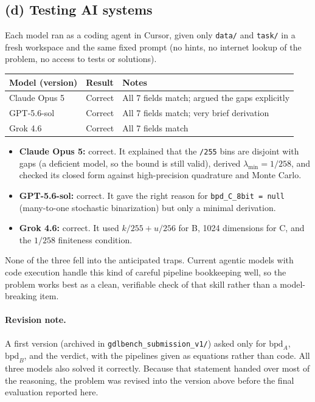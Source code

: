 \documentclass[11pt]{article}
\begin{document}
\subsection{(d) Testing AI systems}

Each model ran as a coding agent in Cursor, given only \texttt{data/} and
\texttt{task/} in a fresh workspace and the same fixed prompt (no hints, no
internet lookup of the problem, no access to tests or solutions).

\begin{center}
\begin{tabular}{@{}lll@{}}
\toprule
Model (version) & Result & Notes\\
\midrule
Claude Opus 5 & Correct & All 7 fields match; argued the gaps explicitly\\
GPT-5.6-sol & Correct & All 7 fields match; very brief derivation\\
Grok 4.6 & Correct & All 7 fields match\\
\bottomrule
\end{tabular}
\end{center}

\begin{itemize}
  \item \textbf{Claude Opus 5:} correct. It explained that the \texttt{/255} bins are
        disjoint with gaps (a deficient model, so the bound is still valid),
        derived \(\lambda_{\min}=1/258\), and checked its closed form against
        high-precision quadrature and Monte Carlo.
  \item \textbf{GPT-5.6-sol:} correct. It gave the right reason for
        \texttt{bpd\_C\_8bit = null} (many-to-one stochastic binarization) but
        only a minimal derivation.
  \item \textbf{Grok 4.6:} correct. It used \(k/255+u/256\) for B, 1024
        dimensions for C, and the \(1/258\) finiteness condition.
\end{itemize}
None of the three fell into the anticipated traps. Current agentic models
with code execution handle this kind of careful pipeline bookkeeping well, so
the problem works best as a clean, verifiable check of that skill rather than
a model-breaking item.

\paragraph{Revision note.} A first version (archived in
\texttt{gdlbench\_submission\_v1/}) asked only for \(\mathrm{bpd}_A\),
\(\mathrm{bpd}_B\), and the verdict, with the pipelines given as equations
rather than code. All three models also solved it correctly. Because that
statement handed over most of the reasoning, the problem was revised into the
version above before the final evaluation reported here.
\end{document}
